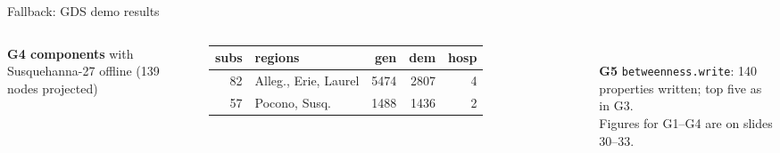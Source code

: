 \documentclass[aspectratio=169, 10pt]{beamer}
\begin{document}
\begin{frame}[fragile]{Fallback: GDS demo results}
\begin{columns}[T]
      \textbf{G4 components} with Susquehanna-27 offline (139 nodes projected)\\[2pt]
      \begin{tabular}{@{}rlrrr@{}}\toprule
        subs & regions & gen & dem & hosp\\ \midrule
        82 & Alleg., Erie, Laurel & 5474 & 2807 & 4\\
        57 & Pocono, Susq. & 1488 & 1436 & 2\\ \bottomrule
      \end{tabular}\\[8pt]
      \textbf{G5} \texttt{betweenness.write}: 140 properties written; top five as in G3.\\[8pt]
      Figures for G1--G4 are on slides 30--33.
  \end{columns}
\end{frame}
\end{document}
